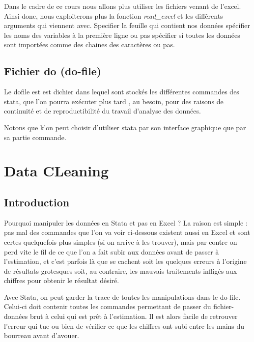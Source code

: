 \documentclass[
]{book}
\theoremstyle{definition}
\theoremstyle{definition}
\theoremstyle{definition}
\theoremstyle{definition}
\theoremstyle{remark}
\begin{document}
Dans le cadre de ce cours nous allons plus utiliser les fichiers venant de l'excel. Ainsi donc, nous exploiterons plus la fonction \emph{read\_excel} et les différents arguments qui viennent avec.
Specifier la feuille qui contient nos données
spécifier les noms des variables à la première ligne ou pas
spécifier si toutes les données sont importées comme des chaines des caractères ou pas.

\hypertarget{fichier-do-do-file}{%
\section{Fichier do (do-file)}\label{fichier-do-do-file}}

Le dofile est est dichier dans lequel sont stockés les différentes commandes des stata, que l'on pourra exécuter plus tard , au besoin, pour des raisons de continuité et de reproductibilité du travail d'analyse des données.

Notons que k'on peut choisir d'utiliser stata par son interface graphique que par sa partie commande.

\hypertarget{data-cleaning}{%
\chapter{Data CLeaning}\label{data-cleaning}}

\hypertarget{introduction}{%
\section{Introduction}\label{introduction}}

Pourquoi manipuler les données en Stata et pas en Excel ? La raison est simple : pas mal des commandes que l'on va voir ci-dessous existent aussi en Excel et sont certes quelquefois plus simples (si on arrive à les trouver), mais par contre on perd vite le fil de ce que l'on a fait subir aux données avant de passer à l'estimation, et c'est parfois là que se cachent soit les quelques erreurs à l'origine de résultats grotesques soit, au contraire, les mauvais traitements infligés aux chiffres pour obtenir le résultat désiré.

Avec Stata, on peut garder la trace de toutes les manipulations dans le do-file. Celui-ci doit contenir toutes les commandes permettant de passer du fichier-données brut à celui qui est prêt à l'estimation. Il est alors facile de retrouver l'erreur qui tue ou bien de vérifier ce que les chiffres ont subi entre les mains du bourreau avant d'avouer.
\end{document}
